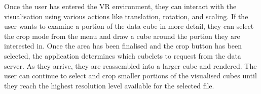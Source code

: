 Once the user has entered the VR environment, they can interact with the visualisation using various actions like translation, rotation, and scaling. 
If the user wants to examine a portion of the data cube in more detail, they can select the crop mode from the menu and draw a cube around the portion they are interested in. 
Once the area has been finalised and the crop button has been selected, the application determines which cubelets to request from the data server. 
As they arrive, they are reassembled into a larger cube and rendered. 
The user can continue to select and crop smaller portions of the visualised cubes until they reach the highest resolution level available for the selected file.




